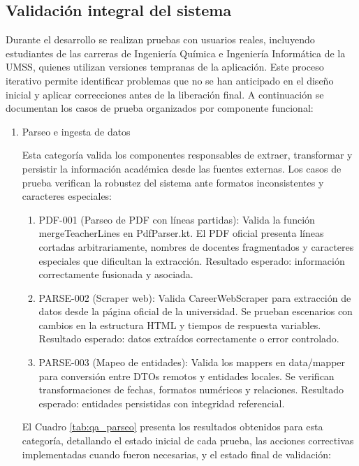 \subsection{Validación integral del sistema}
Durante el desarrollo se realizan pruebas con usuarios reales, incluyendo estudiantes de las carreras de Ingeniería Química e Ingeniería Informática de la UMSS, quienes utilizan versiones tempranas de la aplicación. Este proceso iterativo permite identificar problemas que no se han anticipado en el diseño inicial y aplicar correcciones antes de la liberación final. A continuación se documentan los casos de prueba organizados por componente funcional:

\begin{enumerate}
  \item Parseo e ingesta de datos
  
  Esta categoría valida los componentes responsables de extraer, transformar y persistir la información académica desde las fuentes externas. Los casos de prueba verifican la robustez del sistema ante formatos inconsistentes y caracteres especiales:
  
  \begin{enumerate}[label=\alph*)]
    \item PDF-001 (Parseo de PDF con líneas partidas): Valida la función mergeTeacherLines en PdfParser.kt. El PDF oficial presenta líneas cortadas arbitrariamente, nombres de docentes fragmentados y caracteres especiales que dificultan la extracción. Resultado esperado: información correctamente fusionada y asociada.
    
    \item PARSE-002 (Scraper web): Valida CareerWebScraper para extracción de datos desde la página oficial de la universidad. Se prueban escenarios con cambios en la estructura HTML y tiempos de respuesta variables. Resultado esperado: datos extraídos correctamente o error controlado.
    
    \item PARSE-003 (Mapeo de entidades): Valida los mappers en data/mapper para conversión entre DTOs remotos y entidades locales. Se verifican transformaciones de fechas, formatos numéricos y relaciones. Resultado esperado: entidades persistidas con integridad referencial.
  \end{enumerate}
  
  El Cuadro \ref{tab:qa_parseo} presenta los resultados obtenidos para esta categoría, detallando el estado inicial de cada prueba, las acciones correctivas implementadas cuando fueron necesarias, y el estado final de validación:
  

\end{enumerate}

